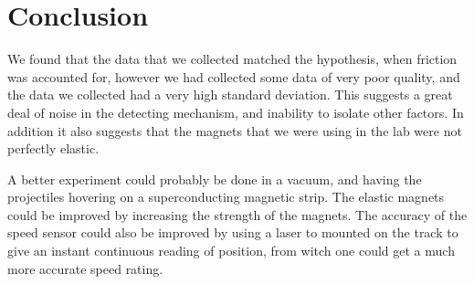 \documentclass{article}
\begin{document}
\section*{Conclusion}
We found that the data that we collected matched the hypothesis, when friction was accounted for, however we had collected some data of very poor quality, and the data we collected had a very high standard deviation. This suggests a great deal of noise in the detecting mechanism, and inability to isolate other factors. In addition it also suggests that the magnets that we were using in the lab were not perfectly elastic.
\par
A better experiment could probably be done in a vacuum, and having the projectiles hovering on a superconducting magnetic strip. The elastic magnets could be improved by increasing the strength of the magnets. The accuracy of the speed sensor could also be improved by using a laser to  mounted on the track to give an instant continuous reading of position, from witch one could get a much more accurate speed rating.
\end{document}
